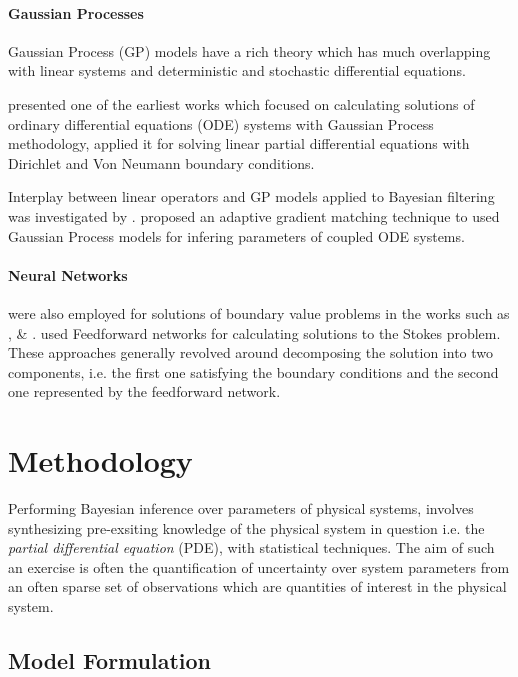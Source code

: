 \documentclass{article}
\begin{document}
\paragraph{Gaussian Processes}

Gaussian Process (GP) models \citep{Rasmussen:2005:GPM:1162254} have a rich theory which has much overlapping with linear systems and deterministic and stochastic differential equations. 

\citet{Skilling1992} presented one of the earliest works which focused on calculating solutions of ordinary differential equations (ODE) systems with Gaussian Process methodology, \citet{Graepel} applied it for solving linear partial differential equations with Dirichlet and Von Neumann boundary conditions.

Interplay between linear operators and GP models applied to Bayesian filtering was investigated by \citet{Sarkka2011}. \citet{pmlr-v31-dondelinger13a} proposed an adaptive gradient matching technique to used Gaussian Process models for infering parameters of coupled ODE systems.

\paragraph{Neural Networks} were also employed for solutions of boundary value problems in the works such as \citet{Lagaris}, \citet{Aarts2001} \&  \citet{TSOULOS20092385}. \citet{Baymani2011} used Feedforward networks for calculating solutions to the Stokes problem. These approaches generally revolved around decomposing the solution into two components, i.e. the first one satisfying the boundary conditions and the second one represented by the feedforward network.

\section{Methodology}

Performing Bayesian inference over parameters of physical systems,
involves synthesizing pre-exsiting knowledge of the physical system in
question i.e. the \emph{partial differential equation} (PDE), with
statistical techniques. The aim of such an exercise is often the
quantification of uncertainty over system parameters from an often
sparse set of observations which are quantities of interest in the
physical system. 


\subsection{Model Formulation}
\end{document}

